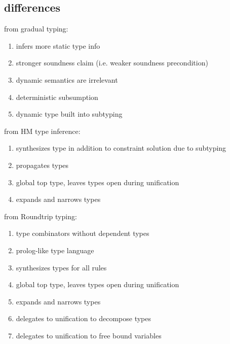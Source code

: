 \documentclass[sigplan,screen]{acmart}
\begin{document}
\subsection*{differences}
from gradual typing:  
\begin{enumerate}
  \item infers more static type info 
  \item stronger soundness claim (i.e. weaker soundness precondition)
  \item dynamic semantics are irrelevant 
  \item deterministic subsumption 
  \item dynamic type built into subtyping 
\end{enumerate}

from HM type inference:  
\begin{enumerate}
  \item synthesizes type in addition to constraint solution 
    due to subtyping
  \item propagates types
  \item global top type, leaves types open during unification
  \item expands and narrows types  
\end{enumerate}

from Roundtrip typing:  
\begin{enumerate}
  \item type combinators without dependent types
  \item prolog-like type language  
  \item synthesizes types for all rules
  \item global top type, leaves types open during unification
  \item expands and narrows types  
  \item delegates to unification to decompose types 
  \item delegates to unification to free bound variables 
\end{enumerate}
\end{document}
